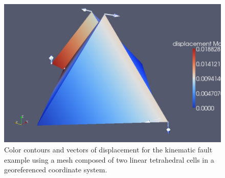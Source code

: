 \begin{figure}
\begin{centering}
\includegraphics[scale=0.33]{tutorials/twocells/figs/twotet4-geoproj-dislocation}
\par\end{centering}

\caption{Color contours and vectors of displacement for the kinematic fault
example using a mesh composed of two linear tetrahedral cells in a
georeferenced coordinate system.\label{fig:twotet4-geoproj-disloc}}
\end{figure}

